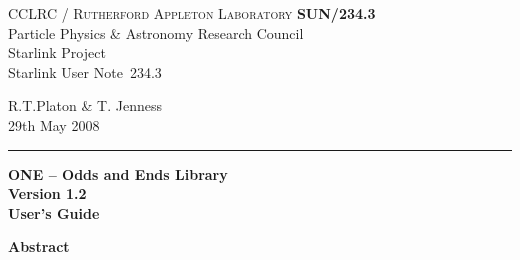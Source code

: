 \documentclass[twoside,11pt]{article}
\newcommand{\stardoccategory}  {Starlink User Note}
\newcommand{\stardocinitials}  {SUN}
\newcommand{\stardocnumber}    {234.3}
\newcommand{\stardocauthors}   {R.T.Platon \& T. Jenness}
\newcommand{\stardocdate}      {29th May 2008}
\newcommand{\stardoctitle}     {ONE -- Odds and Ends Library}
\newcommand{\stardocversion}   {Version 1.2}
\newcommand{\stardocmanual}    {User's Guide}
\newcommand{\stardocname}{\stardocinitials /\stardocnumber}
\newenvironment{latexonly}{}{}
\renewcommand{\_}{\texttt{\symbol{95}}}
\begin{document}
\thispagestyle{empty}

\begin{latexonly}
   CCLRC / \textsc{Rutherford Appleton Laboratory} \hfill \textbf{\stardocname}\\
   {\large Particle Physics \& Astronomy Research Council}\\
   {\large Starlink Project\\}
   {\large \stardoccategory\ \stardocnumber}
   \begin{flushright}
   \stardocauthors\\
   \stardocdate
   \end{flushright}
   \vspace{-4mm}
   \rule{\textwidth}{0.5mm}
   \vspace{5mm}
   \begin{center}
   {\Huge\textbf{\stardoctitle \\ [2.5ex]}}
   {\LARGE\textbf{\stardocversion \\ [4ex]}}
   {\Huge\textbf{\stardocmanual}}
   \end{center}
   \vspace{5mm}


   \vspace{10mm}
   \begin{center}
      {\Large\textbf{Abstract}}
   \end{center}
\end{latexonly}
\end{document}
